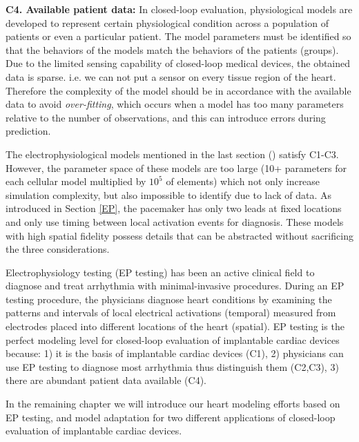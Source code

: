 \textbf{C4. Available patient data: } In closed-loop evaluation, physiological models are developed to represent certain physiological condition across a population of patients or even a particular patient. The model parameters must be identified so that the behaviors of the models match the behaviors of the patients (groups).  Due to the limited sensing capability of closed-loop medical devices, the obtained data is sparse. i.e. we can not put a sensor on every tissue region of the heart. Therefore the complexity of the model should be in accordance with the available data to avoid \emph{over-fitting}, which occurs when a model has too many parameters relative to the number of observations, and this can introduce errors during prediction. 

The electrophysiological models mentioned in the last section (\cite{natalia,Grosu_MHA}) satisfy C1-C3. However, the parameter space of these models are too large (10+ parameters for each cellular model multiplied by $10^5$ of elements) which not only increase simulation complexity, but also impossible to identify due to lack of data. As introduced in Section \ref{EP}, the pacemaker has only two leads at fixed locations and only use timing between local activation events for diagnosis. These models with high spatial fidelity possess details that can be abstracted without sacrificing the three considerations.

Electrophysiology testing (EP testing) has been an active clinical field to diagnose and treat arrhythmia with minimal-invasive procedures. During an EP testing procedure, the physicians diagnose heart conditions by examining the patterns and intervals of local electrical activations (temporal) measured from electrodes placed into different locations of the heart (spatial). EP testing is the perfect modeling level for closed-loop evaluation of implantable cardiac devices because: 1) it is the basis of implantable cardiac devices (C1), 2) physicians can use EP testing to diagnose most arrhythmia thus distinguish them (C2,C3), 3) there are abundant patient data available (C4). 

In the remaining chapter we will introduce our heart modeling efforts based on EP testing, and model adaptation for two different applications of closed-loop evaluation of implantable cardiac devices.



